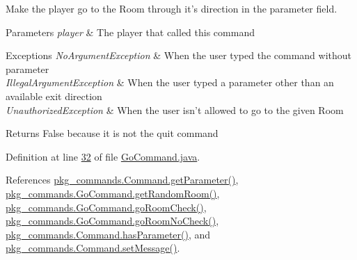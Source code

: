 Make the player go to the Room through it's direction in the parameter field. 


\begin{DoxyParams}{Parameters}
{\em player} & The player that called this command \\
\hline
\end{DoxyParams}

\begin{DoxyExceptions}{Exceptions}
{\em No\-Argument\-Exception} & When the user typed the command without parameter \\
\hline
{\em Illegal\-Argument\-Exception} & When the user typed a parameter other than an available exit direction \\
\hline
{\em Unauthorized\-Exception} & When the user isn't allowed to go to the given Room \\
\hline
\end{DoxyExceptions}
\begin{DoxyReturn}{Returns}
False because it is not the quit command 
\end{DoxyReturn}


Definition at line \hyperlink{GoCommand_8java_source_l00032}{32} of file \hyperlink{GoCommand_8java_source}{Go\-Command.\-java}.



References \hyperlink{Command_8java_source_l00041}{pkg\-\_\-commands.\-Command.\-get\-Parameter()}, \hyperlink{GoCommand_8java_source_l00087}{pkg\-\_\-commands.\-Go\-Command.\-get\-Random\-Room()}, \hyperlink{GoCommand_8java_source_l00056}{pkg\-\_\-commands.\-Go\-Command.\-go\-Room\-Check()}, \hyperlink{GoCommand_8java_source_l00071}{pkg\-\_\-commands.\-Go\-Command.\-go\-Room\-No\-Check()}, \hyperlink{Command_8java_source_l00073}{pkg\-\_\-commands.\-Command.\-has\-Parameter()}, and \hyperlink{Command_8java_source_l00089}{pkg\-\_\-commands.\-Command.\-set\-Message()}.


